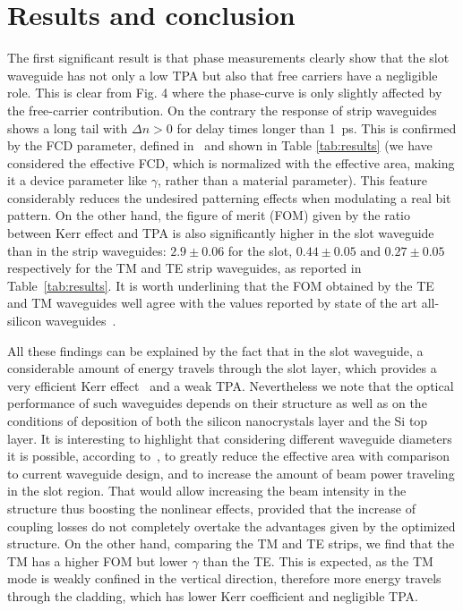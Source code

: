 \documentclass[10pt,letterpaper]{article}
\begin{document}
\section{Results and conclusion}
The first significant result is that phase measurements clearly show that the slot waveguide has not only a low TPA but also that free carriers have a negligible role. This is clear from Fig. 4 where the phase-curve is only slightly affected by the free-carrier contribution. On the contrary the response of strip waveguides shows a long tail with $\Delta n >0$ for delay times longer than 1~ps. This is confirmed by the FCD parameter, defined in~\cite{Lin2007} and shown in Table \ref{tab:results} (we have considered the effective FCD, which is normalized with the effective area, making it a device parameter like $\gamma$, rather than a material parameter). This feature considerably reduces the undesired patterning effects when modulating a real bit pattern. On the other hand, the figure of merit (FOM) given by the ratio between Kerr effect and TPA is also significantly higher in the slot waveguide than in the strip waveguides: $2.9\pm 0.06$ for the slot, $0.44 \pm 0.05$ and $0.27 \pm 0.05$ respectively for 
the TM and TE strip waveguides, as reported in Table~\ref{tab:results}. It is worth underlining that the FOM obtained by the TE and TM waveguides well agree with the values reported by state of the art all-silicon waveguides~\cite{Koos2007a}.

All these findings can be explained by the fact that in the slot waveguide, a considerable amount of energy travels through the slot layer, which provides a very efficient Kerr effect~\cite{Trita2011} and a weak TPA. Nevertheless we note that the optical performance of such waveguides depends on their structure as well as on the conditions of deposition of both the silicon nanocrystals layer and the Si top layer. It is interesting to highlight that considering different waveguide diameters it is possible, according to~\cite{Rukhlenko2012}, to greatly reduce the effective area with comparison to current waveguide design, and to increase the amount of beam power traveling in the slot region. That would allow increasing the beam intensity in the structure thus boosting the nonlinear effects, provided that the increase of coupling losses do not completely overtake the advantages given by the optimized structure. On the other hand, comparing the TM and TE strips, we find that the TM has a higher FOM but lower $\gamma$ than the TE. This is expected, as the TM mode is weakly confined in the vertical direction, therefore more energy travels through the cladding, which has lower Kerr coefficient and negligible TPA.
\end{document}
